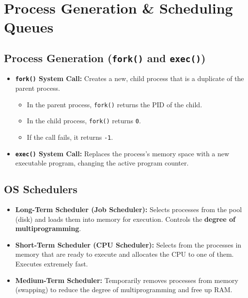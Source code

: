 \documentclass[12pt,a4paper]{article}
\begin{document}
\section{Process Generation \& Scheduling Queues}

\subsection{Process Generation (\texttt{fork()} and \texttt{exec()})}
\begin{itemize}[leftmargin=*, itemsep=3pt]
  \item \textbf{\texttt{fork()} System Call:} Creates a new, child process that is a duplicate of the parent process.
  \begin{itemize}[leftmargin=*, itemsep=2.5pt, topsep=0pt]
    \item In the parent process, \texttt{fork()} returns the PID of the child.
    \item In the child process, \texttt{fork()} returns \texttt{0}.
    \item If the call fails, it returns \texttt{-1}.
  \end{itemize}
  \item \textbf{\texttt{exec()} System Call:} Replaces the process's memory space with a new executable program, changing the active program counter.
\end{itemize}

\subsection{OS Schedulers}
\begin{itemize}[leftmargin=*, itemsep=3pt]
  \item \textbf{Long-Term Scheduler (Job Scheduler):} Selects processes from the pool (disk) and loads them into memory for execution. Controls the \textbf{degree of multiprogramming}.
  \item \textbf{Short-Term Scheduler (CPU Scheduler):} Selects from the processes in memory that are ready to execute and allocates the CPU to one of them. Executes extremely fast.
  \item \textbf{Medium-Term Scheduler:} Temporarily removes processes from memory (swapping) to reduce the degree of multiprogramming and free up RAM.
\end{itemize}
\end{document}
